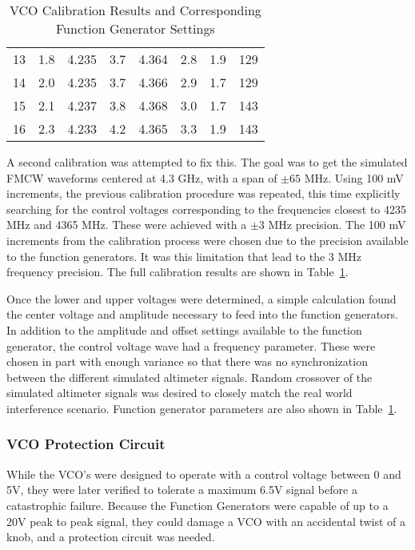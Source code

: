 \begin{table}[]
\begin{tabular}{@{}c|cc|cc|ccc@{}}
13  & 1.8      & 4.235           & 3.7      & 4.364           & 2.8             & 1.9                & 129                    \\
14  & 2.0      & 4.235           & 3.7      & 4.366           & 2.9             & 1.7                & 129                    \\
15  & 2.1      & 4.237           & 3.8      & 4.368           & 3.0             & 1.7                & 143                    \\
16  & 2.3      & 4.233           & 4.2      & 4.365           & 3.3             & 1.9                & 143                   
\end{tabular}
\caption{VCO Calibration Results and Corresponding Function Generator Settings}
\label{tab:VCO_Cal}
\end{table}


A second calibration was attempted to fix this. The goal was to get the simulated FMCW waveforms centered at 4.3 GHz, with a span of $\pm65$ MHz. Using 100 mV increments, the previous calibration procedure was repeated, this time explicitly searching for the control voltages corresponding to the frequencies closest to 4235 MHz and 4365 MHz. These were achieved with a $\pm3$ MHz precision. The 100 mV increments from the calibration process were chosen due to the precision available to the function generators. It was this limitation that lead to the 3 MHz frequency precision. The full calibration results are shown in Table~\ref{tab:VCO_Cal}.

Once the lower and upper voltages were determined, a simple calculation found the center voltage and amplitude necessary to feed into the function generators. In addition to the amplitude and offset settings available to the function generator, the control voltage wave had a frequency parameter. These were chosen in part with enough variance so that there was no synchronization between the different simulated altimeter signals. Random crossover of the simulated altimeter signals was desired to closely match the real world interference scenario. Function generator parameters are also shown in Table~\ref{tab:VCO_Cal}.

\subsubsection{VCO Protection Circuit}
While the VCO's were designed to operate with a control voltage between 0 and 5V, they were later verified to tolerate a maximum 6.5V signal before a catastrophic failure. Because the Function Generators were capable of up to a 20V peak to peak signal, they could damage a VCO with an accidental twist of a knob, and a protection circuit was needed.

